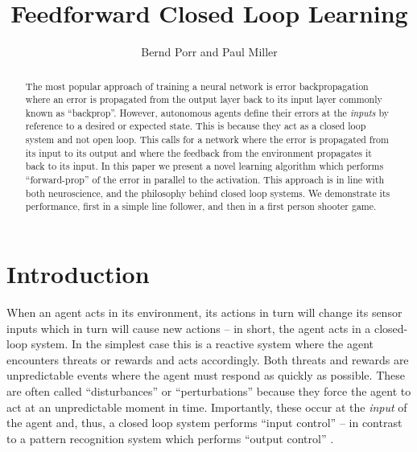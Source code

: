 \documentclass[Afour,sageh,times]{sagej}
\begin{document}

\title{Feedforward Closed Loop Learning}

\author{Bernd Porr and Paul Miller}




\begin{abstract}
  The most popular approach of training a neural network is
  error backpropagation where an error is propagated from the
  output layer back to its input layer commonly known as ``backprop''.
  However, autonomous agents define their errors at the
  \textsl{inputs} by reference to a desired or expected state. This is
  because they act as a closed loop system and not open loop. This
  calls for a network where the error is propagated from its input to
  its output and where the feedback from the environment propagates it
  back to its input. In this paper we present a novel learning
  algorithm which performs ``forward-prop'' of the error in parallel
  to the activation. This approach is in line with both neuroscience,
  and the philosophy behind closed loop systems. We demonstrate its
  performance, first in a simple line follower, and then in a first
  person shooter game.
\end{abstract}


\maketitle

\section{Introduction}
When an agent acts in its environment, its actions in turn will change
its sensor inputs which in turn will cause new actions -- in short,
the agent acts in a closed-loop system. In the simplest case this is a
reactive system where the agent encounters threats or rewards and acts
accordingly. Both threats and rewards are unpredictable events where
the agent must respond as quickly as possible. These are often called
``disturbances'' \cite{Phillips2000} or ``perturbations''
\cite{Maturana80} because they force the agent to act at an
unpredictable moment in time. Importantly, these occur at the
\textsl{input} of the agent and, thus, a closed loop system performs
``input control'' \cite{Ashby72,Phillips2000} -- in contrast to a
pattern recognition system which performs ``output control''
\cite{Phillips2000,Porr2005kyb}.
\end{document}
